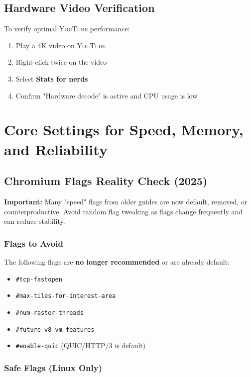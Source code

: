 \documentclass[11pt,a4paper,oneside]{book}
\newcommand{\youtube}{\textsc{YouTube}}
\newcommand{\menupath}[1]{\textbf{\color{darkgray}#1}}
\newcommand{\flag}[1]{\texttt{\color{accentorange}\#{}#1}}
\begin{document}
\section{Hardware Video Verification}

To verify optimal \youtube{} performance:

\begin{enumerate}
    \item Play a 4K video on \youtube{}
    \item Right-click twice on the video
    \item Select \menupath{Stats for nerds}
    \item Confirm "Hardware decode" is active and CPU usage is low
\end{enumerate}

\chapter{Core Settings for Speed, Memory, and Reliability}

\section{Chromium Flags Reality Check (2025)}

\begin{warningbox}
\textbf{Important:} Many "speed" flags from older guides are now default, removed, or counterproductive. Avoid random flag tweaking as flags change frequently and can reduce stability.
\end{warningbox}

\subsection{Flags to Avoid}

The following flags are \textbf{no longer recommended} or are already default:

\begin{itemize}
    \item \flag{tcp-fastopen}
    \item \flag{max-tiles-for-interest-area}
    \item \flag{num-raster-threads}
    \item \flag{future-v8-vm-features}
    \item \flag{enable-quic} (QUIC/HTTP/3 is default)
\end{itemize}

\subsection{Safe Flags (Linux Only)}
\end{document}
